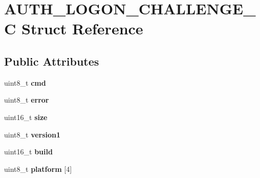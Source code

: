 \hypertarget{struct_a_u_t_h___l_o_g_o_n___c_h_a_l_l_e_n_g_e___c}{\section{A\-U\-T\-H\-\_\-\-L\-O\-G\-O\-N\-\_\-\-C\-H\-A\-L\-L\-E\-N\-G\-E\-\_\-\-C Struct Reference}
\label{struct_a_u_t_h___l_o_g_o_n___c_h_a_l_l_e_n_g_e___c}
}
\subsection*{Public Attributes}
\begin{DoxyCompactItemize}
\item 
\hypertarget{struct_a_u_t_h___l_o_g_o_n___c_h_a_l_l_e_n_g_e___c_aeae61a22cd55f7c638252be18eb60b30}{uint8\-\_\-t {\bfseries cmd}}\label{struct_a_u_t_h___l_o_g_o_n___c_h_a_l_l_e_n_g_e___c_aeae61a22cd55f7c638252be18eb60b30}

\item 
\hypertarget{struct_a_u_t_h___l_o_g_o_n___c_h_a_l_l_e_n_g_e___c_a9940a1075f1f87d6a1c0ea66276e07d0}{uint8\-\_\-t {\bfseries error}}\label{struct_a_u_t_h___l_o_g_o_n___c_h_a_l_l_e_n_g_e___c_a9940a1075f1f87d6a1c0ea66276e07d0}

\item 
\hypertarget{struct_a_u_t_h___l_o_g_o_n___c_h_a_l_l_e_n_g_e___c_a1f8350f5e288085f6f8b02edbe5066d5}{uint16\-\_\-t {\bfseries size}}\label{struct_a_u_t_h___l_o_g_o_n___c_h_a_l_l_e_n_g_e___c_a1f8350f5e288085f6f8b02edbe5066d5}

\item 
\hypertarget{struct_a_u_t_h___l_o_g_o_n___c_h_a_l_l_e_n_g_e___c_afe16cdd01959b8359007898ed9fe4eaf}{uint8\-\_\-t {\bfseries version1}}\label{struct_a_u_t_h___l_o_g_o_n___c_h_a_l_l_e_n_g_e___c_afe16cdd01959b8359007898ed9fe4eaf}

\item 
\hypertarget{struct_a_u_t_h___l_o_g_o_n___c_h_a_l_l_e_n_g_e___c_a4adc97b95b3e27fd31c156305d7a6d2f}{uint16\-\_\-t {\bfseries build}}\label{struct_a_u_t_h___l_o_g_o_n___c_h_a_l_l_e_n_g_e___c_a4adc97b95b3e27fd31c156305d7a6d2f}

\item 
\hypertarget{struct_a_u_t_h___l_o_g_o_n___c_h_a_l_l_e_n_g_e___c_a75c0962888103ce2f59fb25d9eacddad}{uint8\-\_\-t {\bfseries platform} \mbox{[}4\mbox{]}}\label{struct_a_u_t_h___l_o_g_o_n___c_h_a_l_l_e_n_g_e___c_a75c0962888103ce2f59fb25d9eacddad}


\end{DoxyCompactItemize}
